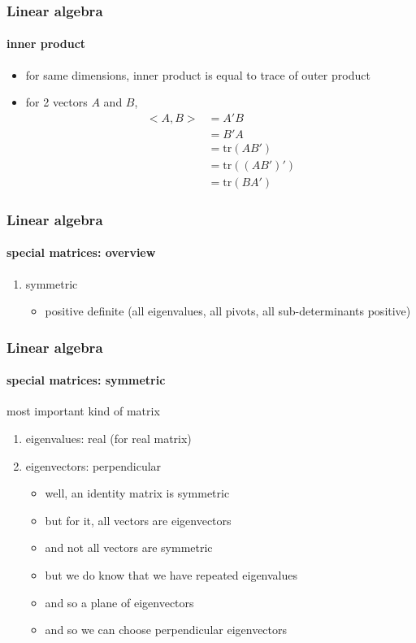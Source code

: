 \begin{frame}
\frametitle{Linear algebra}
\framesubtitle{inner product}
\logoCSIPCPL\mypagenum\mypagenum
	\begin{itemize}
		\item for same dimensions, inner product is equal to trace of outer product
		\item for 2 vectors $A$ and $B$,
			\begin{equation*}
				\begin{array}{lll}				
					<A,B> 	&= A'B \\
							&= B'A \\
							&= \mbox{tr}(AB') \\
							&= \mbox{tr}((AB')') \\
							&= \mbox{tr}(BA')
				\end{array}
			\end{equation*}
	\end{itemize}
\end{frame}


\begin{frame}
\frametitle{Linear algebra}
\framesubtitle{special matrices: overview}
\logoCSIPCPL\mypagenum\mypagenum
	\begin{enumerate}
		\item {\color{red} symmetric}
			\begin{itemize}
				\item {\color{blue}positive definite} (all eigenvalues, all pivots, all sub-determinants positive)
			\end{itemize}
	\end{enumerate}
\end{frame}


\begin{frame}
\frametitle{Linear algebra}
\framesubtitle{special matrices: symmetric}
\logoCSIPCPL\mypagenum\mypagenum
	most important kind of matrix
	\begin{enumerate}
		\item eigenvalues: real (for real matrix)
		\item eigenvectors: perpendicular
			\begin{itemize}
				\item well, an identity matrix is symmetric
				\item but for it, all vectors are eigenvectors
				\item and not all vectors are symmetric
				\item but we do know that we have repeated eigenvalues
				\item and so a plane of eigenvectors
				\item and so we can choose perpendicular eigenvectors
			\end{itemize}
	\end{enumerate}
\end{frame}


